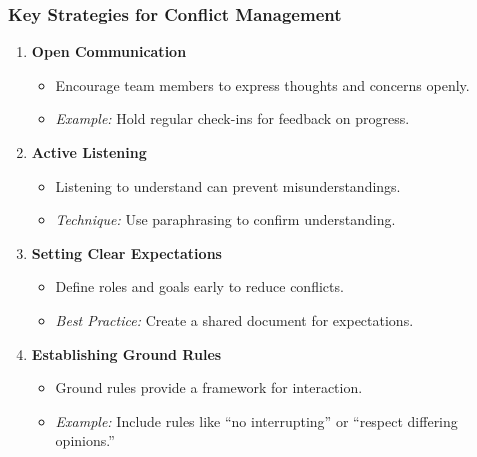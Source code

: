 \documentclass[aspectratio=169]{beamer}
\begin{document}
\begin{frame}[fragile]
    \frametitle{Key Strategies for Conflict Management}
    \begin{enumerate}
        \item \textbf{Open Communication}
            \begin{itemize}
                \item Encourage team members to express thoughts and concerns openly.
                \item \textit{Example:} Hold regular check-ins for feedback on progress.
            \end{itemize}

        \item \textbf{Active Listening}
            \begin{itemize}
                \item Listening to understand can prevent misunderstandings.
                \item \textit{Technique:} Use paraphrasing to confirm understanding.
            \end{itemize}

        \item \textbf{Setting Clear Expectations}
            \begin{itemize}
                \item Define roles and goals early to reduce conflicts.
                \item \textit{Best Practice:} Create a shared document for expectations.
            \end{itemize}

        \item \textbf{Establishing Ground Rules}
            \begin{itemize}
                \item Ground rules provide a framework for interaction.
                \item \textit{Example:} Include rules like “no interrupting” or “respect differing opinions.”
            \end{itemize}
    \end{enumerate}
\end{frame}
\end{document}
